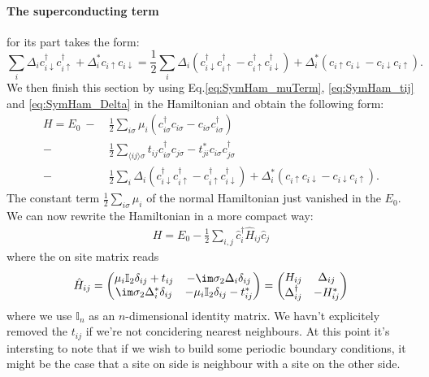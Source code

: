 \documentclass[../main.tex]{subfile}
\begin{document}
\paragraph{The superconducting term} for its part takes the form:
\begin{equation}\label{eq:SymHam_Delta}
\sum_{i} \Delta_i c_{i\downarrow}^{\dagger}c_{i\uparrow}^{\dagger} + \Delta_i^{\ast} c_{i\uparrow}c_{i\downarrow}
        = \frac{1}{2}\sum_{i} \Delta_i \left(c_{i\downarrow}^{\dagger}c_{i\uparrow}^{\dagger}-c_{i\uparrow}^{\dagger}c_{i\downarrow}^{\dagger}\right)+ \Delta_i^{\ast} \left(c_{i\uparrow}c_{i\downarrow}-c_{i\downarrow}c_{i\uparrow}\right).
\end{equation}
We then finish this section by using Eq.\ref{eq:SymHam_muTerm}, \ref{eq:SymHam_tij} and \ref{eq:SymHam_Delta} in the Hamiltonian and obtain the following form:
\begin{align*}
    H = E_0 ~-~& \frac{1}{2} \sum_{i\sigma} \mu_i\left(c_{i\sigma}^{\dagger}c_{i\sigma} - c_{i\sigma}c_{i\sigma}^{\dagger}\right)\\
    -& \frac{1}{2}\sum_{\langle ij\rangle \sigma} t_{ij}c_{i\sigma}^{\dagger}c_{j\sigma} - t_{ji}^{\ast}c_{i\sigma}c_{j\sigma}^{\dagger}\\
    -& \frac{1}{2}\sum_{i} \Delta_i \left(c_{i\downarrow}^{\dagger}c_{i\uparrow}^{\dagger}-c_{i\uparrow}^{\dagger}c_{i\downarrow}^{\dagger}\right) +
    \Delta_i^{\ast} \left(c_{i\uparrow}c_{i\downarrow}-c_{i\downarrow}c_{i\uparrow}\right).
\end{align*}
The constant term $\frac{1}{2} \sum_{i\sigma} \mu_i$ of the normal Hamiltonian just vanished in the $E_0$. 
We can now rewrite the Hamiltonian in a more compact way:
\begin{align}
    H = E_0 - \frac{1}{2}\sum_{i,j} \hat{c}_i^{\dagger} \hat{H}_{ij} \hat{c}_j  \label{eq:BdG_sys_H}
\end{align}
where the on site matrix reads
\begin{align}
    \hat{H}_{ij} = \begin{pmatrix}
        \mu_i \mathbb{I}_2 \delta_{ij} + t_{ij} & -\im\sigma_2\Delta_i \delta_{ij}\\
        \im\sigma_2\Delta^{\ast}_i \delta_{ij} & -\mu_i \mathbb{I}_2 \delta_{ij} - t_{ij}^{\ast}
    \end{pmatrix} = \begin{pmatrix}
        H_{ij} & \Delta_{ij}\\
        \Delta_{ij}^{\dagger} & -H_{ij}^{\ast}
    \end{pmatrix}    \label{eq:H^_ij} 
\end{align}
where we use $\mathbb{I}_n$ as an $n$-dimensional identity matrix. We havn't explicitely removed the 
$t_{ij}$ if we're not concidering nearest neighbours.
At this point it's intersting to note that if we wish to build some periodic boundary conditions, 
it might be the case that a site on side is neighbour with a site on the other side.\\  
\end{document}
